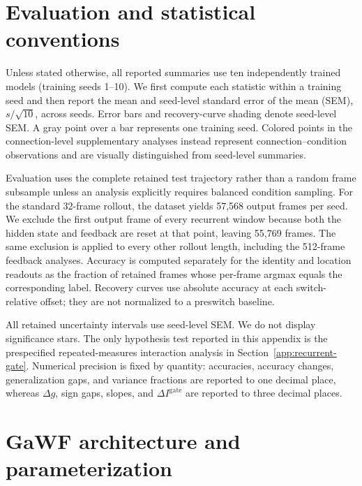 \providecommand{\dg}{\Delta g}

\appendix

\section*{Evaluation and statistical conventions}
\label{app:statistical-conventions}

Unless stated otherwise, all reported summaries use ten independently trained models (training seeds 1--10). We first compute each statistic within a training seed and then report the mean and seed-level standard error of the mean (SEM), \(s/\sqrt{10}\), across seeds. Error bars and recovery-curve shading denote seed-level SEM. A gray point over a bar represents one training seed. Colored points in the connection-level supplementary analyses instead represent connection--condition observations and are visually distinguished from seed-level summaries.

Evaluation uses the complete retained test trajectory rather than a random frame subsample unless an analysis explicitly requires balanced condition sampling. For the standard 32-frame rollout, the dataset yields 57,568 output frames per seed. We exclude the first output frame of every recurrent window because both the hidden state and feedback are reset at that point, leaving 55,769 frames. The same exclusion is applied to every other rollout length, including the 512-frame feedback analyses. Accuracy is computed separately for the identity and location readouts as the fraction of retained frames whose per-frame argmax equals the corresponding label. Recovery curves use absolute accuracy at each switch-relative offset; they are not normalized to a preswitch baseline.

All retained uncertainty intervals use seed-level SEM. We do not display significance stars. The only hypothesis test reported in this appendix is the prespecified repeated-measures interaction analysis in Section~\ref{app:recurrent-gate}. Numerical precision is fixed by quantity: accuracies, accuracy changes, generalization gaps, and variance fractions are reported to one decimal place, whereas \(\dg\), sign gaps, slopes, and \(\Delta I^{\mathrm{gate}}\) are reported to three decimal places.

\section{GaWF architecture and parameterization}
\label{app:gawf-architecture}

